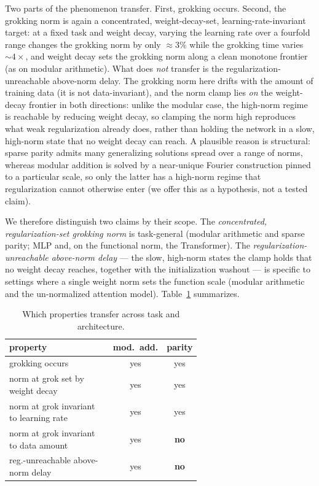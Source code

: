 \documentclass[10pt,twocolumn]{article}
\begin{document}
Two parts of the phenomenon transfer. First, grokking occurs. Second, the grokking norm is again a
concentrated, weight-decay-set, learning-rate-invariant target: at a fixed task and weight decay, varying
the learning rate over a fourfold range changes the grokking norm by only $\approx3\%$ while the grokking
time varies $\sim\!4\times$, and weight decay sets the grokking norm along a clean monotone frontier (as on
modular arithmetic). What does \emph{not} transfer is the regularization-unreachable above-norm delay. The
grokking norm here drifts with the amount of training data (it is not data-invariant), and the norm clamp
lies \emph{on} the weight-decay frontier in both directions: unlike the modular case, the high-norm regime
is reachable by reducing weight decay, so clamping the norm high reproduces what weak regularization already
does, rather than holding the network in a slow, high-norm state that no weight decay can reach. A plausible
reason is structural: sparse parity admits many generalizing solutions spread over a range of norms, whereas
modular addition is solved by a near-unique Fourier construction pinned to a particular scale, so only the
latter has a high-norm regime that regularization cannot otherwise enter (we offer this as a hypothesis, not
a tested claim).

We therefore distinguish two claims by their scope. The \emph{concentrated, regularization-set grokking
norm} is task-general (modular arithmetic and sparse parity; MLP and, on the functional norm, the
Transformer). The \emph{regularization-unreachable above-norm delay} --- the slow, high-norm states the
clamp holds that no weight decay reaches, together with the initialization washout --- is specific to
settings where a single weight norm sets the function scale (modular arithmetic and the un-normalized
attention model). Table~\ref{tab:generality} summarizes.

\begin{table}[t]
\centering\small
\caption{Which properties transfer across task and architecture.}
\label{tab:generality}
\begin{tabular}{@{}p{0.62\linewidth}cc@{}}
\toprule
property & mod.\ add. & parity \\
\midrule
grokking occurs                          & yes & yes \\
norm at grok set by weight decay         & yes & yes \\
norm at grok invariant to learning rate  & yes & yes \\
norm at grok invariant to data amount    & yes & \textbf{no} \\
reg.-unreachable above-norm delay        & yes & \textbf{no} \\
\bottomrule
\end{tabular}
\end{table}
\end{document}
